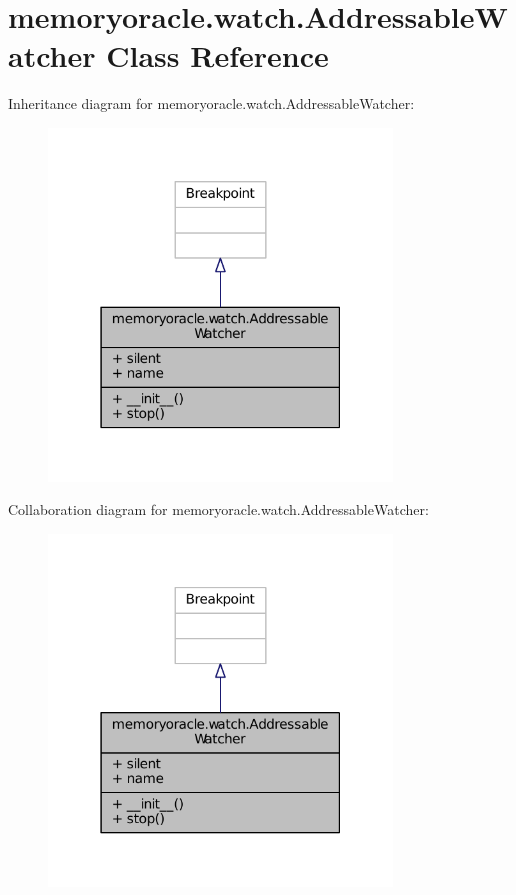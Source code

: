 \hypertarget{classmemoryoracle_1_1watch_1_1AddressableWatcher}{}\section{memoryoracle.\+watch.\+Addressable\+Watcher Class Reference}
\label{classmemoryoracle_1_1watch_1_1AddressableWatcher}


Inheritance diagram for memoryoracle.\+watch.\+Addressable\+Watcher\+:\nopagebreak
\begin{figure}[H]
\begin{center}
\leavevmode
\includegraphics[width=259pt]{classmemoryoracle_1_1watch_1_1AddressableWatcher__inherit__graph}
\end{center}
\end{figure}


Collaboration diagram for memoryoracle.\+watch.\+Addressable\+Watcher\+:\nopagebreak
\begin{figure}[H]
\begin{center}
\leavevmode
\includegraphics[width=259pt]{classmemoryoracle_1_1watch_1_1AddressableWatcher__coll__graph}
\end{center}
\end{figure}
